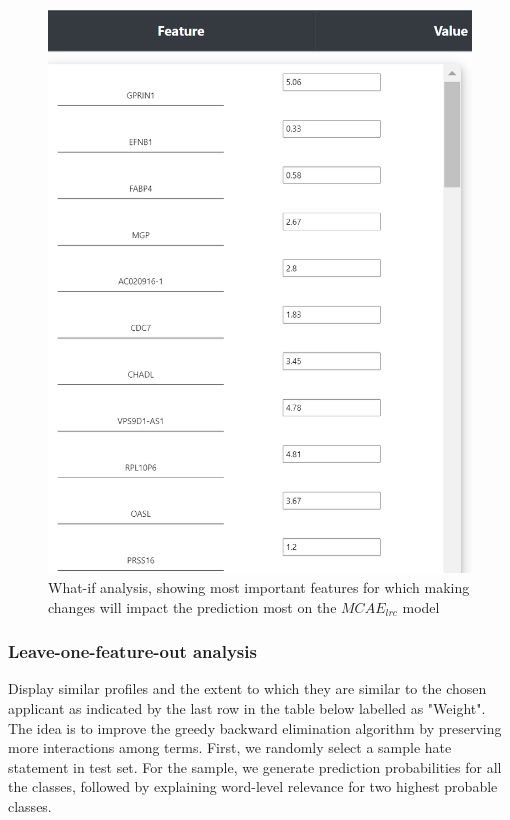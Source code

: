 \begin{figure}[h]
    \centering
	\includegraphics[scale=0.7]{images/what_if.png}
	\caption[What-if analysis]{What-if analysis, showing most important features for which making changes will impact the prediction most on the $MCAE_{lrc}$ model}
    \label{fig:what_if}
\end{figure}

\subsubsection{Leave-one-feature-out analysis}
Display similar profiles and the extent to which they are similar to the chosen applicant as indicated by the last row in the table below labelled as "Weight". The idea is to improve the greedy backward elimination algorithm by preserving more interactions among terms. First, we randomly select a sample hate statement in test set. For the sample, we generate prediction probabilities for all the classes, followed by explaining word-level relevance for two highest probable classes. 

